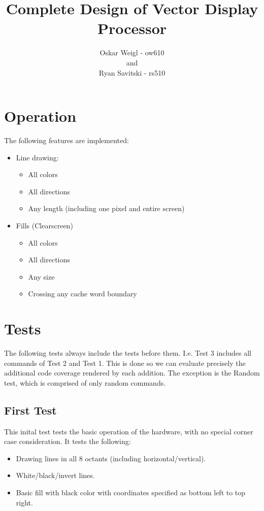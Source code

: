 \documentclass[]{article}
\title{Complete Design of Vector Display Processor}
\author{Oskar Weigl - ow610\\ and \\ Ryan Savitski - rs510}
\begin{document}
\maketitle


\tableofcontents
\clearpage

\section{Operation}
The following features are implemented:
\begin{itemize}
	\item Line drawing:
	\begin{itemize}
		\item All colors
		\item All directions
		\item Any length (including one pixel and entire screen)
	\end{itemize}
	\item Fills (Clearscreen)
	\begin{itemize}
		\item All colors
		\item All directions
		\item Any size
		\item Crossing any cache word boundary
	\end{itemize}
\end{itemize}

\section{Tests} %
\label{sec:tests}

The following tests always include the tests before them. I.e. Test 3 includes all commands of Test 2 and Test 1. This is done so we can evaluate precisely the additional code coverage rendered by each addition. The exception is the Random test, which is comprised of only random commands.

\subsection{First Test} %
\label{sub:first_test}

This inital test tests the basic operation of the hardware, with no special corner case consideration. It tests the following:
\begin{itemize}
	\item Drawing lines in all 8 octants (including horizontal/vertical).
	\item White/black/invert lines.
	\item Basic fill with black color with coordinates specified as bottom left to top right.
\end{itemize}
\end{document}
